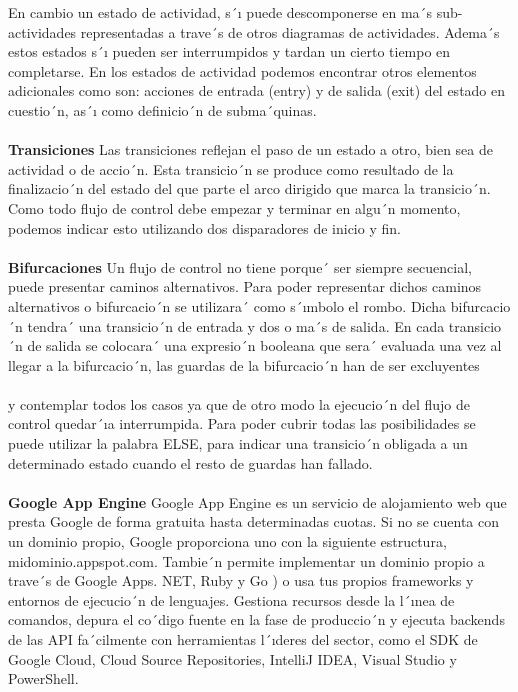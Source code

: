 \documentclass[conference,compsoc,onecolumn]{IEEEtran}
\begin{document}
En  cambio  un  estado  de  actividad,  s´ı  puede  descomponerse  en  ma´s  sub-  actividades  representadas  a  trave´s  de otros  diagramas  de  actividades.  Adema´s  estos  estados  s´ı  pueden  ser  interrumpidos  y  tardan  un  cierto  tiempo  en completarse. En los estados de actividad podemos encontrar otros elementos adicionales como son: acciones de entrada (entry) y de salida (exit) del estado en cuestio´n, as´ı como definicio´n de subma´quinas.
\\
\\
\textbf{Transiciones} Las transiciones reflejan el paso de un estado a otro, bien sea de actividad o de accio´n. Esta transicio´n se produce como resultado de la finalizacio´n del estado del que parte el arco dirigido que marca la transicio´n. Como todo flujo de control debe empezar y terminar en algu´n momento, podemos indicar esto utilizando dos disparadores de inicio y fin.
\\
\\
\textbf{Bifurcaciones} Un flujo de control no tiene porque´ ser siempre secuencial, puede presentar caminos alternativos. Para poder representar dichos caminos alternativos o bifurcacio´n se utilizara´  como s´ımbolo el rombo. Dicha bifurcacio´n tendra´  una  transicio´n  de  entrada  y  dos  o  ma´s  de  salida.  En  cada  transicio´n  de  salida  se  colocara´  una  expresio´n booleana que sera´  evaluada una vez al llegar a la bifurcacio´n, las guardas de la bifurcacio´n han de ser excluyentes
 \\
 \\
y  contemplar  todos  los  casos  ya  que  de  otro  modo  la  ejecucio´n  del  flujo  de  control  quedar´ıa  interrumpida.  Para poder  cubrir  todas  las  posibilidades  se  puede  utilizar  la  palabra  ELSE,  para  indicar  una  transicio´n  obligada  a  un determinado estado cuando el resto de guardas han fallado.
\\
\\
\textbf{Google App Engine} Google App Engine es un servicio de alojamiento web que presta Google de forma gratuita  hasta determinadas cuotas. Si no se cuenta con un dominio propio, Google proporciona uno con la siguiente estructura,  midominio.appspot.com.  Tambie´n  permite  implementar  un  dominio  propio  a  trave´s  de  Google  Apps. NET, Ruby y Go ) o usa tus propios frameworks y entornos de ejecucio´n de lenguajes. Gestiona recursos desde la l´ınea de comandos, depura el co´digo fuente en la fase de produccio´n y ejecuta backends de las API fa´cilmente con herramientas l´ıderes del sector, como el SDK de Google Cloud, Cloud Source Repositories, IntelliJ IDEA, Visual Studio y PowerShell.
\end{document}
